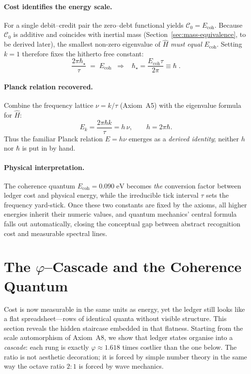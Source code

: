 \documentclass[11pt]{article}
\begin{document}
\paragraph{Cost identifies the energy scale.}
For a single debit–credit pair the zero–debt functional yields
\(\mathcal{C}_{0}=E_{\text{coh}}\).
Because \(\mathcal{C}_{0}\) is additive and coincides with inertial mass
(Section~\ref{sec:mass-equivalence}, to be derived later), the smallest
non-zero eigenvalue of \(\widehat{H}\) \emph{must equal}
\(E_{\text{coh}}\).  Setting \(k=1\) therefore fixes the hitherto free
constant:
\[
\frac{2\pi\hbar_{\star}}{\tau}
\;=\;
E_{\text{coh}}
\;\;\Longrightarrow\;\;
\boxed{\;
\hbar_{\star}
=
\frac{E_{\text{coh}}\tau}{2\pi}
\equiv
\hbar
\;}.
\]

\paragraph{Planck relation recovered.}
Combine the frequency lattice \(\nu = k/\tau\) (Axiom~A5) with the
eigenvalue formula for \(\widehat{H}\):
\[
E_{k}
=
\frac{2\pi\hbar k}{\tau}
=
h\,\nu,
\qquad
h = 2\pi\hbar.
\]
Thus the familiar Planck relation
\(\boxed{E = h\nu}\)
emerges as a \emph{derived identity}; neither \(h\) nor \(\hbar\) is put
in by hand.

\paragraph{Physical interpretation.}
The coherence quantum \(E_{\text{coh}}=0.090\;\text{eV}\) becomes
\emph{the} conversion factor between ledger cost and physical energy,
while the irreducible tick interval \(\tau\) sets the frequency yard-stick.
Once these two constants are fixed by the axioms, all higher energies
inherit their numeric values, and quantum mechanics’ central formula
falls out automatically, closing the conceptual gap between abstract
recognition cost and measurable spectral lines.

\section{The \texorpdfstring{$\varphi$}{$\varphi$}–Cascade and the Coherence Quantum}
\label{sec:phi-cascade}

Cost is now measurable in the same units as energy, yet the ledger still
looks like a flat spreadsheet—rows of identical quanta without visible
structure.  This section reveals the hidden staircase embedded in that
flatness.  Starting from the scale automorphism of Axiom~A8, we show that
ledger states organise into a \emph{cascade}: each rung is exactly
\(\varphi\!\approx\!1.618\) times costlier than the one below.  The
ratio is not aesthetic decoration; it is forced by simple number theory
in the same way the octave ratio \(2{:}1\) is forced by wave mechanics.
\end{document}
